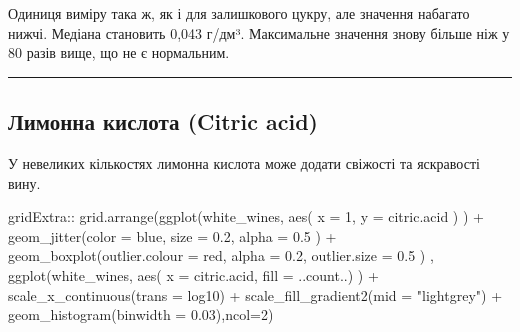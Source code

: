 \documentclass[
  letterpaper,
  DIV=11,
  numbers=noendperiod]{scrreprt}
\newenvironment{Shaded}{\begin{snugshade}}{\end{snugshade}}
\newcommand{\AttributeTok}[1]{\textcolor[rgb]{0.40,0.45,0.13}{#1}}
\newcommand{\DecValTok}[1]{\textcolor[rgb]{0.68,0.00,0.00}{#1}}
\newcommand{\FloatTok}[1]{\textcolor[rgb]{0.68,0.00,0.00}{#1}}
\newcommand{\FunctionTok}[1]{\textcolor[rgb]{0.28,0.35,0.67}{#1}}
\newcommand{\NormalTok}[1]{\textcolor[rgb]{0.00,0.23,0.31}{#1}}
\newcommand{\SpecialCharTok}[1]{\textcolor[rgb]{0.37,0.37,0.37}{#1}}
\newcommand{\StringTok}[1]{\textcolor[rgb]{0.13,0.47,0.30}{#1}}
\begin{document}
Одиниця виміру така ж, як і для залишкового цукру, але значення набагато
нижчі. Медіана становить 0,043 г/дм³. Максимальне значення знову більше
ніж у 80 разів вище, що не є нормальним.

\begin{center}\rule{0.5\linewidth}{0.5pt}\end{center}

\subsection{Лимонна кислота (Citric
acid)}\label{ux43bux438ux43cux43eux43dux43dux430-ux43aux438ux441ux43bux43eux442ux430-citric-acid}

У невеликих кількостях лимонна кислота може додати свіжості та
яскравості вину.

\begin{Shaded}
\begin{Highlighting}[]
\NormalTok{gridExtra}\SpecialCharTok{::} \FunctionTok{grid.arrange}\NormalTok{(}\FunctionTok{ggplot}\NormalTok{(white\_wines, }\FunctionTok{aes}\NormalTok{( }\AttributeTok{x =} \DecValTok{1}\NormalTok{, }\AttributeTok{y =}\NormalTok{ citric.acid ) ) }\SpecialCharTok{+} 
               \FunctionTok{geom\_jitter}\NormalTok{(}\AttributeTok{color =} \StringTok{\textquotesingle{}blue\textquotesingle{}}\NormalTok{, }\AttributeTok{size =} \FloatTok{0.2}\NormalTok{, }\AttributeTok{alpha =} \FloatTok{0.5}\NormalTok{ ) }\SpecialCharTok{+}
               \FunctionTok{geom\_boxplot}\NormalTok{(}\AttributeTok{outlier.colour =} \StringTok{\textquotesingle{}red\textquotesingle{}}\NormalTok{, }\AttributeTok{alpha =} \FloatTok{0.2}\NormalTok{, }\AttributeTok{outlier.size =} \FloatTok{0.5}\NormalTok{ ) ,}
             \FunctionTok{ggplot}\NormalTok{(white\_wines, }\FunctionTok{aes}\NormalTok{( }\AttributeTok{x   =}\NormalTok{ citric.acid, }\AttributeTok{fill =}\NormalTok{ ..count..) ) }\SpecialCharTok{+}
               \FunctionTok{scale\_x\_continuous}\NormalTok{(}\AttributeTok{trans =} \StringTok{\textquotesingle{}log10\textquotesingle{}}\NormalTok{) }\SpecialCharTok{+}
               \FunctionTok{scale\_fill\_gradient2}\NormalTok{(}\AttributeTok{mid =} \StringTok{"lightgrey"}\NormalTok{) }\SpecialCharTok{+}
                   \FunctionTok{geom\_histogram}\NormalTok{(}\AttributeTok{binwidth =} \FloatTok{0.03}\NormalTok{),}\AttributeTok{ncol=}\DecValTok{2}\NormalTok{)}
\end{Highlighting}
\end{Shaded}
\end{document}
